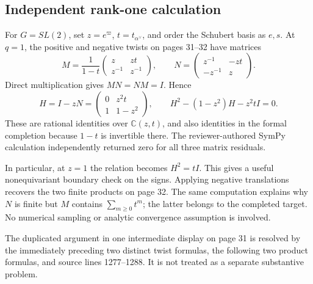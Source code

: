 \documentclass[10pt]{article}
\begin{document}
\subsection*{Independent rank-one calculation}
For \(G=SL(2)\), set \(z=e^\varpi\), \(t=t_{\alpha^\vee}\), and order the Schubert basis as \(e,s\). At \(q=1\), the positive and negative twists on pages 31–32 have matrices \[M=\frac1{1-t}
 \begin{pmatrix}z&zt\\z^{-1}&z^{-1}\end{pmatrix},
 \qquad
 N=\begin{pmatrix}z^{-1}&-zt\\-z^{-1}&z\end{pmatrix}.\] Direct multiplication gives \(MN=NM=I\). Hence \[H=I-zN=
 \begin{pmatrix}0&z^2t\\1&1-z^2\end{pmatrix},
 \qquad H^2-(1-z^2)H-z^2tI=0.\] These are rational identities over \(\mathbb C(z,t)\), and also identities in the formal completion because \(1-t\) is invertible there. The reviewer-authored SymPy calculation independently returned zero for all three matrix residuals.\par
In particular, at \(z=1\) the relation becomes \(H^2=tI\). This gives a useful nonequivariant boundary check on the signs. Applying negative translations recovers the two finite products on page 32. The same computation explains why \(N\) is finite but \(M\) contains \(\sum_{m\geq0}t^m\); the latter belongs to the completed target. No numerical sampling or analytic convergence assumption is involved.\par
The duplicated argument in one intermediate display on page 31 is resolved by the immediately preceding two distinct twist formulas, the following two product formulas, and source lines 1277–1288. It is not treated as a separate substantive problem.\par
\end{document}
